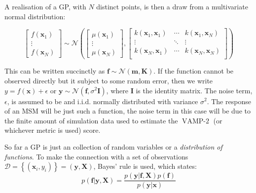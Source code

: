A realisation of a GP, with $N$ distinct points, is then a draw from a multivariate normal distribution: 

\begin{equation}
\begin{bmatrix}  f\left(\mathbf{x}_{1}\right) \\ \vdots \\ f\left(\mathbf{x}_{N}\right) \end{bmatrix} 
\sim 
\mathcal{N}\left( 
\begin{bmatrix} \mu\left(\mathbf{x}_{1}\right) \\  \vdots \\ \mu\left(\mathbf{x}_{N}\right) \end{bmatrix}, 
\begin{bmatrix}
k(\mathbf{x}_{1}, \mathbf{x}_{1}) & \cdots & k(\mathbf{x}_{1}, \mathbf{x}_{N}) \\
\vdots & \ddots & \vdots \\
k(\mathbf{x}_{N}, \mathbf{x}_{1}) & \cdots & k(\mathbf{x}_{N}, \mathbf{x}_{N}) \\
\end{bmatrix}
\right)
\end{equation}

This can be written succinctly as $\mathbf{f} \sim \mathcal{N}(\mathbf{m}, \mathbf{K})$. If the function cannot be observed directly but it subject to some random error, then we write $y = f(\mathbf{x}) + \epsilon$ or  $\mathbf{y} \sim \mathcal{N}(\mathbf{f}, \sigma^{2}\mathbf{I})$, where $\mathbf{I}$ is the identity matrix.  The noise term, $\epsilon$, is assumed to be and i.i.d. normally distributed with variance $\sigma^{2}$. The response of an MSM will be just such a function, the noise term in this case will be due to the finite amount of simulation data used to estimate the $\operatorname{VAMP-2}$ (or whichever metric is used) score. 

So far a GP is just an collection of random variables or a \emph{distribution of functions}.  To make the connection with a set of observations $\mathcal{D}=\left\{(\mathbf{x}_{i}, y_{i})\right\} = (\mathbf{y}, \mathbf{X})$, Bayes' rule is used, which states: 
\begin{equation}\label{eqn:ya_boy_bayes}
    p(\mathbf{f}|\mathbf{y}, \mathbf{X})  = \frac{p(\mathbf{y}|\mathbf{f}, \mathbf{X})p(\mathbf{f})}{p(\mathbf{y}|\mathbf{x})}
\end{equation}

